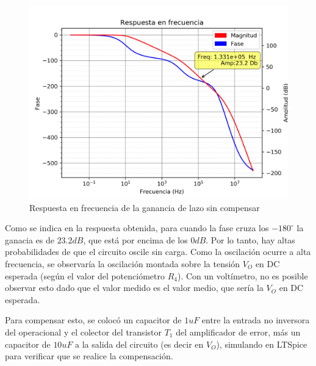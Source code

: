 \begin{figure}[!ht]
\begin{centering}
\includegraphics[scale=0.58]{Imagenes/Fuente_SinComp.png}
\par\end{centering}
\caption{Respuesta en frecuencia de la ganancia de lazo sin compensar}

\end{figure}

Como se indica en la respuesta obtenida, para cuando la fase cruza los $-180^{\circ}$ la ganacia es de $23.2dB$, que est\'a por encima de los $0dB$. Por lo tanto, hay altas probabilidades de que el circuito oscile sin carga. Como la oscilaci\'on ocurre a alta frecuencia, se observar\'ia la oscilaci\'on montada sobre la tensi\'on $V_O$ en DC esperada (seg\'un el valor del potenci\'ometro $R_4$). Con un volt\'imetro, no es posible observar esto dado que el valor medido es el valor medio, que ser\'ia la $V_O$ en DC esperada.

Para compensar esto, se coloc\'o un capacitor de $1uF$ entre la entrada no inversora del operacional y el colector del transistor $T_1$ del amplificador de error, m\'as un capacitor de $10uF$ a la salida del circuito (es decir en $V_O$), simulando en LTSpice para verificar que se realice la compensaci\'on.

